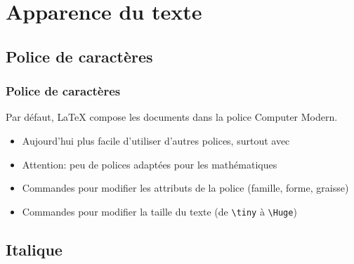\section{Apparence du texte}

\subsection{Police de caractères}

\begin{frame}[fragile=singleslide]
  \frametitle{Police de caractères}

  Par défaut, {\LaTeX} compose les documents dans la police
  {\CM Computer Modern}.

  \begin{itemize}
  \item Aujourd'hui plus facile d'utiliser d'autres polices, surtout
    avec {\XeLaTeX}
  \item \alert{Attention}: peu de polices adaptées pour les
    mathématiques
  \item Commandes pour modifier les \alert{attributs} de la police
    (famille, forme, graisse)
  \item Commandes pour modifier la \alert{taille} du texte (de
    \verb=\tiny= à \verb=\Huge=)
  \end{itemize}
\end{frame}

\subsection{Italique}

